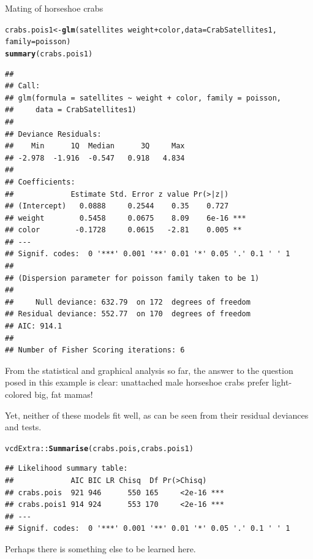 \documentclass[11pt]{book}\usepackage[]{graphicx}\usepackage[]{color}
\makeatletter
\newcommand{\hlopt}[1]{\textcolor[rgb]{0,0,0}{#1}}%
\newcommand{\hlstd}[1]{\textcolor[rgb]{0.345,0.345,0.345}{#1}}%
\newcommand{\hlkwb}[1]{\textcolor[rgb]{0.69,0.353,0.396}{#1}}%
\newcommand{\hlkwc}[1]{\textcolor[rgb]{0.333,0.667,0.333}{#1}}%
\newcommand{\hlkwd}[1]{\textcolor[rgb]{0.737,0.353,0.396}{\textbf{#1}}}%
\newenvironment{kframe}{%
 \def\at@end@of@kframe{}%
 \ifinner\ifhmode%
  \def\at@end@of@kframe{\end{minipage}}%
  \begin{minipage}{\columnwidth}%
 \fi\fi%
 \def\FrameCommand##1{\hskip\@totalleftmargin \hskip-\fboxsep
 \colorbox{shadecolor}{##1}\hskip-\fboxsep
     \hskip-\linewidth \hskip-\@totalleftmargin \hskip\columnwidth}%
 \MakeFramed {\advance\hsize-\width
   \@totalleftmargin\z@ \linewidth\hsize
   \@setminipage}}%
 {\par\unskip\endMakeFramed%
 \at@end@of@kframe}
\newenvironment{knitrout}{}{} %
\renewenvironment{knitrout}{\small\renewcommand{\baselinestretch}{.85}}{} %
\makeatother
\begin{document}
\begin{Example}[crabs1]{Mating of horseshoe crabs}
\begin{knitrout}
\begin{kframe}
\begin{alltt}
\hlstd{crabs.pois1} \hlkwb{<-} \hlkwd{glm}\hlstd{(satellites} \hlopt{~} \hlstd{weight} \hlopt{+} \hlstd{color,} \hlkwc{data}\hlstd{=CrabSatellites1,}
                   \hlkwc{family}\hlstd{=poisson)}
\hlkwd{summary}\hlstd{(crabs.pois1)}
\end{alltt}
\begin{verbatim}
## 
## Call:
## glm(formula = satellites ~ weight + color, family = poisson, 
##     data = CrabSatellites1)
## 
## Deviance Residuals: 
##    Min      1Q  Median      3Q     Max  
## -2.978  -1.916  -0.547   0.918   4.834  
## 
## Coefficients:
##             Estimate Std. Error z value Pr(>|z|)    
## (Intercept)   0.0888     0.2544    0.35    0.727    
## weight        0.5458     0.0675    8.09    6e-16 ***
## color        -0.1728     0.0615   -2.81    0.005 ** 
## ---
## Signif. codes:  0 '***' 0.001 '**' 0.01 '*' 0.05 '.' 0.1 ' ' 1
## 
## (Dispersion parameter for poisson family taken to be 1)
## 
##     Null deviance: 632.79  on 172  degrees of freedom
## Residual deviance: 552.77  on 170  degrees of freedom
## AIC: 914.1
## 
## Number of Fisher Scoring iterations: 6
\end{verbatim}
\end{kframe}
\end{knitrout}

From the statistical and graphical analysis so far, the answer to the question posed
in this example is clear:  unattached male horseshoe crabs prefer light-colored
big, fat mamas!

Yet, neither of these models fit well, as can be seen from their residual deviances
and \LR tests.
\begin{knitrout}
\color{fgcolor}\begin{kframe}
\begin{alltt}
\hlstd{vcdExtra}\hlopt{::}\hlkwd{Summarise}\hlstd{(crabs.pois, crabs.pois1)}
\end{alltt}
\begin{verbatim}
## Likelihood summary table:
##             AIC BIC LR Chisq  Df Pr(>Chisq)    
## crabs.pois  921 946      550 165     <2e-16 ***
## crabs.pois1 914 924      553 170     <2e-16 ***
## ---
## Signif. codes:  0 '***' 0.001 '**' 0.01 '*' 0.05 '.' 0.1 ' ' 1
\end{verbatim}
\end{kframe}
\end{knitrout}
Perhaps there is something else to be learned here.

\end{Example} 
\end{document}
